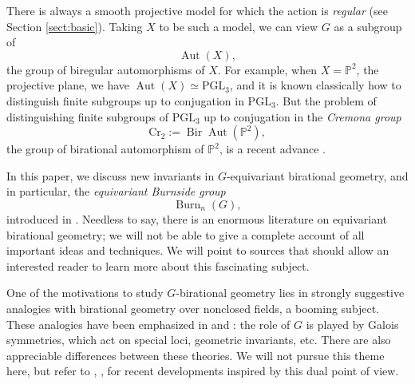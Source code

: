 \documentclass[12pt,reqno]{amsart}
\theoremstyle{plain}
\theoremstyle{remark}
\theoremstyle{definition}
\numberwithin{equation}{section}
\newcommand{\bP}{{\mathbb P}}
\newcommand{\PGL}{{\mathrm{PGL}}}
\DeclareMathOperator{\Aut}{Aut}
\DeclareMathOperator{\Burn}{Burn}
\DeclareMathOperator{\Bir}{Bir}
\begin{document}
\medskip

There is always a smooth projective model for which the action is \emph{regular} (see Section \ref{sect:basic}).
Taking $X$ to be such a model, we can view $G$ as a subgroup of 
$$
\Aut(X),
$$
the group of biregular automorphisms of $X$. 
For example, when $X=\bP^2$, the projective plane, we have $\Aut(X)\simeq \PGL_3$, and it is known classically how to distinguish finite subgroups up to conjugation in $\PGL_3$.
But the problem of distinguishing finite subgroups of $\PGL_3$ up to conjugation in the \emph{Cremona group} 
$$
\mathrm{Cr}_2:=\Bir\Aut(\bP^2),
$$ 
the group of birational automorphism of $\bP^2$, is a recent advance \cite{CTZ-p2}.


In this paper, we discuss new 
invariants in $G$-equivariant birational 
geometry, and in particular, the 
{\em equivariant Burnside group}
$$
\Burn_n(G),
$$
introduced in \cite{BnG}. 
Needless to say, there 
is an enormous literature on equivariant birational geometry; we will not be able to give a complete account of all important ideas and techniques. We will point to sources that should allow an interested reader to learn more about this fascinating subject. 

One of the motivations to study $G$-birational geometry lies in strongly suggestive analogies with birational geometry over nonclosed fields, a booming subject. 
These analogies have been emphasized in \cite{manin} and \cite{manin2}:
the role of $G$ is played by Galois symmetries, which act on special loci, geometric invariants, etc. 
There are also appreciable differences between these theories. We will not pursue this theme here, but refer to \cite{HTtors}, \cite{HT-quad}, \cite{KT-dp} for recent developments inspired by this dual point of view. 

\medskip
\end{document}
